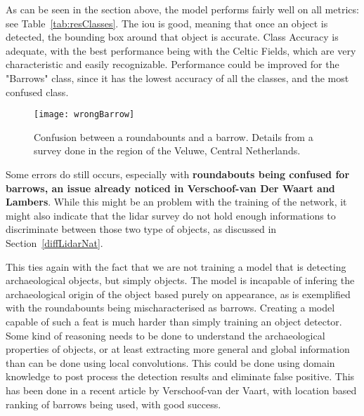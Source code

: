 As can be seen in the section above, the model performs fairly well on all metrics: see Table~\ref{tab:resClasses}. The \gls{iou} is good, meaning that once an object is detected, the bounding box around that object is accurate. Class Accuracy is adequate, with the best performance being with the Celtic Fields, which are very characteristic and easily recognizable. Performance could be improved for the "Barrows" class, since it has the lowest accuracy of all the classes, and the most confused class. 


\begin{figure}[H]
  \centering
  \texttt{[image: wrongBarrow]}
	\caption[]{Confusion between a roundabounts and a barrow. Details from a survey done in the region of the Veluwe, Central Netherlands.}
  \label{}
\end{figure}

Some errors do still occurs, especially with \textbf{roundabouts being confused for barrows, an issue already noticed in Verschoof-van Der Waart and Lambers\cite{wouter2019}}. While this might be an problem with the training of the network, it might also indicate that the \gls{lidar} survey do not hold enough informations to discriminate between those two type of objects, as discussed in Section~\ref{diffLidarNat}. 

This ties again with the fact that we are not training a model that is detecting archaeological objects, but simply objects. The model is incapable of infering the archaeological origin of the object based purely on appearance, as is exemplified with the roundabounts being mischaracterised as barrows. Creating a model capable of such a feat is much harder than simply training an object detector. Some kind of reasoning needs to be done to understand the archaeological properties of objects, or at least extracting more general and global information than can be done using local convolutions. This could be done using domain knowledge to post process the detection results and eliminate false positive. This has been done in a recent article by Verschoof-van der Vaart\cite{lamberVerschoof}, with location based ranking of barrows being used, with good success.   
